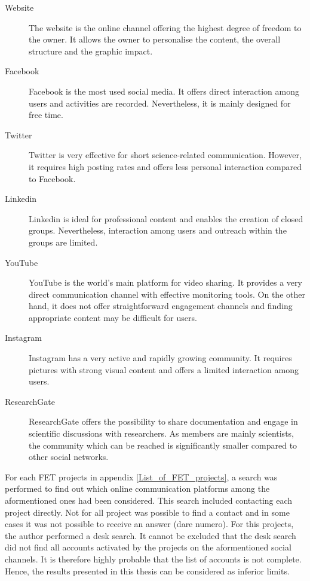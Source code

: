 \begin{description}
 \item [Website] The website is the online channel offering the highest degree of freedom to the owner. It allows the owner to personalise the content, the overall structure and the graphic impact.
 \item [Facebook] Facebook is the most used social media. It offers direct interaction among users and activities are recorded. Nevertheless, it is mainly designed for free time.  
 \item [Twitter] Twitter is very effective for short science-related communication. However, it requires high posting rates and offers less personal interaction compared to Facebook.
 \item [Linkedin] Linkedin is ideal for professional content and enables the creation of closed groups. Nevertheless, interaction among users and outreach within the groups are limited.
 \item [YouTube] YouTube is the world's main platform for video sharing. It provides a very direct communication channel with effective monitoring tools. On the other hand, it does not offer straightforward engagement channels and finding appropriate content may be difficult for users.
 \item [Instagram]Instagram has a very active and rapidly growing community. It requires pictures with strong visual content and offers a limited interaction among users.
 \item [ResearchGate] ResearchGate offers the possibility to share documentation and engage in scientific discussions with researchers. As members are mainly scientists, the community which can be reached is significantly smaller compared to other social networks.  
\end{description}

For each FET projects in appendix \ref{List_of_FET_projects}, a search was performed to find out which online communication platforms among the aformentioned ones had been considered. This search included contacting each project directly. Not for all project was possible to find a contact and in some cases it was not possible to receive an answer (dare numero). For this projects, the author performed a desk search. It cannot be excluded that the desk search did not find all accounts activated by the projects on the aformentioned social channels. It is therefore highly probable that the list of accounts is not complete. Hence, the results presented in this thesis can be considered as inferior limits.   

